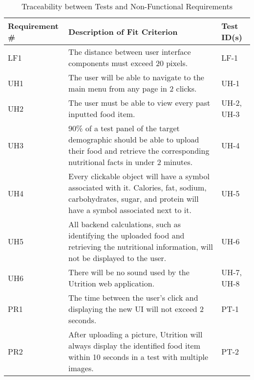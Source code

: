 \documentclass[12pt, titlepage]{article}
\begin{document}
	\begin{table}[H]
		\caption{Traceability between Tests and Non-Functional Requirements}
		\begin{tabularx}{\linewidth}{|l|X|l|}
			\hline
			{\bf Requirement \#} & {\bf Description of Fit Criterion} & {\bf Test ID(s)}\\
			\hline
			LF1 & The distance between user interface components must exceed 20 pixels. & LF-1 \\
			\hline
			UH1 & The user will be able to navigate to the main menu from any page in 2 clicks. & UH-1 \\
			\hline
			UH2 & The user must be able to view every past inputted food item. & UH-2, UH-3 \\
			\hline
			UH3 & 90\% of a test panel of the target demographic should be able to upload their food and retrieve the corresponding nutritional facts in under 2 minutes. & UH-4 \\
			\hline
			UH4 & Every clickable object will have a symbol associated with it. Calories, fat, sodium, carbohydrates, sugar, and protein will have a symbol associated next to it.
			& UH-5 \\
			\hline
			UH5 & All backend calculations, such as identifying the uploaded food and retrieving the nutritional information, will not be displayed to the user. & UH-6 \\
			\hline
			UH6 & There will be no sound used by the Utrition web application.  & UH-7, UH-8 \\
			\hline
			PR1 & The time between the user’s click and displaying the new UI will not exceed 2 seconds. & PT-1 \\
			\hline
			PR2 & After uploading a picture, Utrition will always display the 
			identified food item within 10 seconds in a test with multiple 
			images. & PT-2 \\
			\hline
		\end{tabularx}
		\label{tab:Non-Functional Traceability}
	\end{table}
\end{document}
